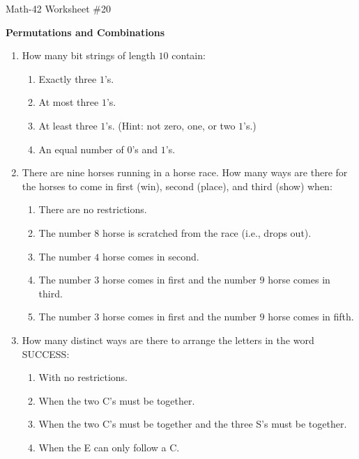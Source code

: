 \documentclass[letterpaper,12pt,fleqn]{article}
\begin{document}
\begin{center}
  \large Math-42 Worksheet \#20

  \textbf{Permutations and Combinations}
\end{center}

\vspace{0.5in}

\begin{enumerate}[left=0in,itemsep=0.5in]
\item How many bit strings of length \(10\) contain:
  \begin{enumerate}
  \item Exactly three \(1\)'s.
  \item At most three \(1\)'s.
  \item At least three \(1\)'s. (Hint: not zero, one, or two \(1\)'s.)
  \item An equal number of \(0\)'s and \(1\)'s.
  \end{enumerate}

\item There are nine horses running in a horse race.  How many ways are there for the horses to come in
  first (win), second (place), and third (show) when:
  \begin{enumerate}
  \item There are no restrictions.
  \item The number \(8\) horse is scratched from the race (i.e., drops out).
  \item The number \(4\) horse comes in second.
  \item The number \(3\) horse comes in first and the number \(9\) horse comes in third.
  \item The number \(3\) horse comes in first and the number \(9\) horse comes in fifth.
  \end{enumerate}
  
\item How many distinct ways are there to arrange the letters in the word SUCCESS:
  \begin{enumerate}
  \item With no restrictions.
  \item When the two C's must be together.
  \item When the two C's must be together and the three S's must be together.
  \item When the E can only follow a C.
  \end{enumerate}


\end{enumerate}
\end{document}
